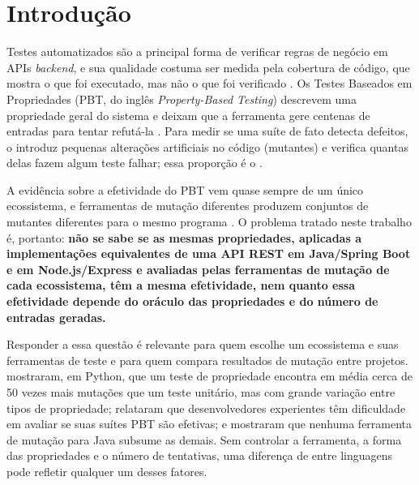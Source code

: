 \section{Introdução}

Testes automatizados são a principal forma de verificar regras de negócio em APIs \textit{backend}, e sua qualidade costuma ser medida pela cobertura de código, que mostra o que foi executado, mas não o que foi verificado \citep{jain2023gap}. Os Testes Baseados em Propriedades (PBT, do inglês \textit{Property-Based Testing}) descrevem uma propriedade geral do sistema e deixam que a ferramenta gere centenas de entradas para tentar refutá-la \citep{claessen2000quickcheck}. Para medir se uma suíte de fato detecta defeitos, o \MT{} introduz pequenas alterações artificiais no código (mutantes) e verifica quantas delas fazem algum teste falhar; essa proporção é o \ms{} \citep{jia2011mutation,papadakis2019mutation}.

A evidência sobre a efetividade do PBT vem quase sempre de um único ecossistema, e ferramentas de mutação diferentes produzem conjuntos de mutantes diferentes para o mesmo programa \citep{kintis2018tools,monteiro2022tools}. O problema tratado neste trabalho é, portanto: \textbf{não se sabe se as mesmas propriedades, aplicadas a implementações equivalentes de uma API REST em Java/Spring Boot e em Node.js/Express e avaliadas pelas ferramentas de mutação de cada ecossistema, têm a mesma efetividade, nem quanto essa efetividade depende do oráculo das propriedades e do número de entradas geradas.}

Responder a essa questão é relevante para quem escolhe um ecossistema e suas ferramentas de teste e para quem compara resultados de mutação entre projetos. \citet{ravi2025pbt} mostraram, em Python, que um teste de propriedade encontra em média cerca de 50 vezes mais mutações que um teste unitário, mas com grande variação entre tipos de propriedade; \citet{goldstein2024pbt} relataram que desenvolvedores experientes têm dificuldade em avaliar se suas suítes PBT são efetivas; e \citet{kintis2018tools} mostraram que nenhuma ferramenta de mutação para Java subsume as demais. Sem controlar a ferramenta, a forma das propriedades e o número de tentativas, uma diferença de \ms{} entre linguagens pode refletir qualquer um desses fatores.

